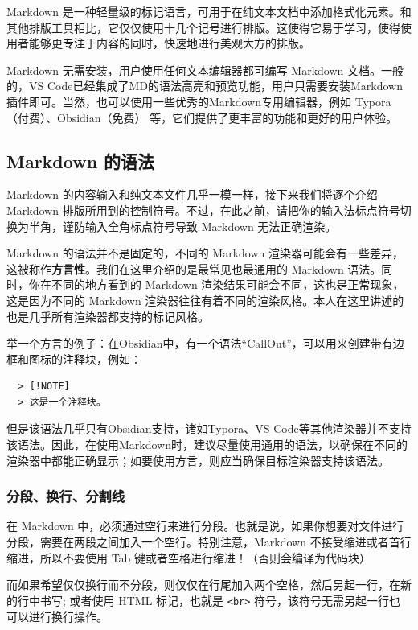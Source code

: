 Markdown 是一种轻量级的标记语言，可用于在纯文本文档中添加格式化元素。和其他排版工具相比，它仅仅使用十几个记号进行排版。这使得它易于学习，使得使用者能够更专注于内容的同时，快速地进行美观大方的排版。

Markdown 无需安装，用户使用任何文本编辑器都可编写 Markdown 文档。一般的，VS Code已经集成了MD的语法高亮和预览功能，用户只需要安装Markdown插件即可。当然，也可以使用一些优秀的Markdown专用编辑器，例如 Typora（付费）、Obsidian（免费） 等，它们提供了更丰富的功能和更好的用户体验。

\subsection{Markdown 的语法}

Markdown 的内容输入和纯文本文件几乎一模一样，接下来我们将逐个介绍 Markdown 排版所用到的控制符号。不过，在此之前，请把你的输入法标点符号切换为半角，谨防输入全角标点符号导致 Markdown 无法正确渲染。

\begin{note}
  Markdown 的语法并不是固定的，不同的 Markdown 渲染器可能会有一些差异，这被称作\textbf{方言性}。我们在这里介绍的是最常见也最通用的 Markdown 语法。同时，你在不同的地方看到的 Markdown 渲染结果可能会不同，这也是正常现象，这是因为不同的 Markdown 渲染器往往有着不同的渲染风格。本人在这里讲述的也是几乎所有渲染器都支持的标记风格。

  举一个方言的例子：在Obsidian中，有一个语法“CallOut”，可以用来创建带有边框和图标的注释块，例如：
  \begin{verbatim}
  > [!NOTE]
  > 这是一个注释块。
  \end{verbatim}
  但是该语法几乎只有Obsidian支持，诸如Typora、VS Code等其他渲染器并不支持该语法。因此，在使用Markdown时，建议尽量使用通用的语法，以确保在不同的渲染器中都能正确显示；如要使用方言，则应当确保目标渲染器支持该语法。
\end{note}

\subsubsection{分段、换行、分割线}

在 Markdown 中，必须通过空行来进行分段。也就是说，如果你想要对文件进行分段，需要在两段之间加入一个空行。特别注意，Markdown 不接受缩进或者首行缩进，所以不要使用 Tab 键或者空格进行缩进！（否则会编译为代码块）

而如果希望仅仅换行而不分段，则仅仅在行尾加入两个空格，然后另起一行，在新的行中书写; 或者使用 HTML 标记，也就是  \texttt{<br>}  符号，该符号无需另起一行也可以进行换行操作。

